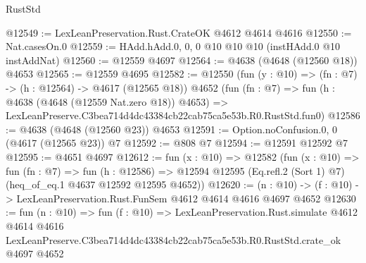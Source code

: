\begin{lexlean}{RustStd}
\begin{coremodule}
@12549 := LexLeanPreservation.Rust.CrateOK @4612 @4614 @4616
@12550 := Nat.casesOn.{0}
@12559 := HAdd.hAdd.{0, 0, 0} @10 @10 @10 (instHAdd.{0} @10 instAddNat)
@12560 := @12559 @4697
@12564 := @4638 (@4648 (@12560 @18)) @4653
@12565 := @12559 @4695
@12582 := @12550
    (fun (y : @10) => (fn : @7) -> (h : @12564) -> @4617 (@12565 @18))
    @4652
    (fun (fn : @7) =>
    fun (h : @4638 (@4648 (@12559 Nat.zero @18)) @4653) =>
    LexLeanPreserve.C3bea714d4dc43384cb22cab75ca5e53b.R0.RustStd.fun0)
@12586 := @4638 (@4648 (@12560 @23)) @4653
@12591 := Option.noConfusion.{0, 0} (@4617 (@12565 @23)) @7
@12592 := @808 @7
@12594 := @12591 @12592 @7
@12595 := @4651 @4697
@12612 := fun (x : @10) =>
  @12582
    (fun (x : @10) =>
    fun (fn : @7) =>
    fun (h : @12586) =>
    @12594 @12595 (Eq.refl.{2} (Sort 1) @7) (heq_of_eq.{1} @4637 @12592 @12595 @4652))
@12620 := (n : @10) -> (f : @10) -> LexLeanPreservation.Rust.FunSem @4612 @4614 @4616 @4697 @4652
@12630 := fun (n : @10) =>
  fun (f : @10) =>
  LexLeanPreservation.Rust.simulate
    @4612
    @4614
    @4616
    LexLeanPreserve.C3bea714d4dc43384cb22cab75ca5e53b.R0.RustStd.crate_ok
    @4697
    @4652
\end{coremodule}
\end{lexlean}
